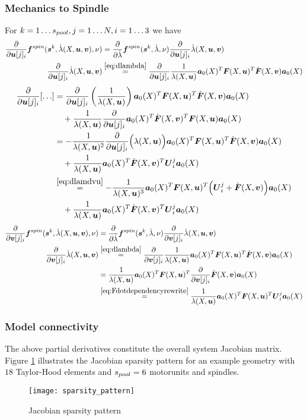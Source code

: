 \subsubsection{Mechanics to Spindle}
For $k=1\ldots{s_{pool}}, j = 1\ldots N, i=1\ldots3$ we have
\begin{align}
	\d{}{\vu[j]_i}\fsp(\vs^k,\dla(X,\vu,\vv),\nu) &= \d{}{\dla}\fsp(\vs^k,\dla,\nu)\d{}{\vu[j]_i}\dla(X,\vu,\vv)\\
	\d{}{\vu[j]_i}\dla(X,\vu,\vv) &\re{eq:dlambda} \d{}{\vu[j]_i}\frac{1}{\la(X,\vu)}\va_0(X)^T\vF(X,\vu)^T\dot{\vF}(X,\vv)\va_0(X)
\end{align}
\begin{align*}
   \d{}{\vu[j]_i} [\ldots] &= \d{}{\vu[j]_i}\left(\frac{1}{\la(X,\vu)}\right)\va_0(X)^T\vF(X,\vu)^T\dot{\vF}(X,\vv)\va_0(X)\\
   &\quad+ \frac{1}{\la(X,\vu)}\d{}{\vu[j]_i}\va_0(X)^T\dot{\vF}(X,\vv)^T\vF(X,\vu)\va_0(X)\\
   &= -\frac{1}{\la(X,\vu)^2}\d{}{\vu[j]_i}\Bigl(\la(X,\vu)\Bigr)\va_0(X)^T\vF(X,\vu)^T\dot{\vF}(X,\vv)\va_0(X)\\
   &\quad+ \frac{1}{\la(X,\vu)}\va_0(X)^T\dot{\vF}(X,\vv)^T\vU_i^j\va_0(X)\\
   &\re{eq:dlamdvu} -\frac{1}{\la(X,\vu)^3}\va_0(X)^T\vF(X,\vu)^T\Bigl(\vU_i^j+\dot{\vF}(X,\vv)\Bigr)\va_0(X)\\
   &\quad+ \frac{1}{\la(X,\vu)}\va_0(X)^T\dot{\vF}(X,\vv)^T\vU_i^j\va_0(X)
\end{align*}
\begin{align}
	\d{}{\vv[j]_i}\fsp(\vs^k,\dla(X,\vu,\vv),\nu) &= \d{}{\dla}\fsp(\vs^k,\dla,\nu)\d{}{\vv[j]_i}\dla(X,\vu,\vv)\\
	\d{}{\vv[j]_i}\dla(X,\vu,\vv) &\re{eq:dlambda} \d{}{\vv[j]_i}\frac{1}{\la(X,\vu)}\va_0(X)^T\vF(X,\vu)^T\dot{\vF}(X,\vv)\va_0(X)\\
		&=\frac{1}{\la(X,\vu)}\va_0(X)^T\vF(X,\vu)^T\d{}{\vv[j]_i}\dot{\vF}(X,\vv)\va_0(X)\\
		&\re{eq:Fdotdependencyrewrite}\frac{1}{\la(X,\vu)}\va_0(X)^T\vF(X,\vu)^T\vU^j_i\va_0(X)
\end{align}

\subsubsection{Model connectivity}
The above partial derivatives constitute the overall system Jacobian matrix.
Figure \ref{fig:jacpattern} illustrates the Jacobian sparsity pattern for an example geometry with $18$ Taylor-Hood elements and ${s_{pool}}=6$ motorunits and spindles.
\begin{figure}[!ht]
	\texttt{[image: sparsity\_pattern]}
	\caption{Jacobian sparsity pattern}
	\label{fig:jacpattern}
\end{figure}
